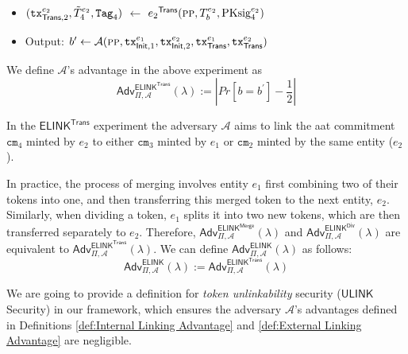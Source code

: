 \begin{definition}
\begin{itemize}
                \item[] $(\texttt{tx}_{\mathsf{Trans},2}^{e_2}, \Tilde{T}^{e_2}_4, \texttt{Tag}_4)$ $\leftarrow$ ${e_2}^\mathsf{Trans}(\textsc{pp}, T_b^{e_2}, \text{PKsig}^{e_2}_4)$
                
                \item[] Output: $b^\prime \leftarrow \mathcal{A}(\textsc{pp},\texttt{tx}_{\mathsf{Init}, 1}^{e_1}, \texttt{tx}_{\mathsf{Init}, 2}^{e_2}, \texttt{tx}_\mathsf{Trans}^{e_1}, \texttt{tx}_\mathsf{Trans}^{e_2})$
        \end{itemize}
We define $\mathcal{A}$'s advantage in the above experiment as
\begin{equation}
\label{eq:Adv_ELINK_Trans}
    \mathsf{Adv}^{\mathsf{ELINK}^\textsf{Trans}}_{\Pi, \mathcal{A}}(\lambda) := |Pr[b=b^\prime] - \frac{1}{2}|
\end{equation}


In the $\mathsf{ELINK}^\textsf{Trans}$ experiment the adversary $\mathcal{A}$ aims to link the \gls{aat} commitment $\texttt{cm}_4$ minted by $e_2$ to either $\texttt{cm}_3$ minted by $e_1$ or $\texttt{cm}_2$ minted by the same entity ($e_2$). 


In practice, the process of merging involves entity $e_1$ first combining two of their tokens into one, and then transferring this merged token to the next entity, $e_2$. Similarly, when dividing a token, $e_1$ splits it into two new tokens, which are then transferred separately to $e_2$. Therefore, $\mathsf{Adv}^{\mathsf{ELINK}^\textsf{Merge}}_{\Pi, \mathcal{A}}(\lambda)$ and $\mathsf{Adv}^{\mathsf{ELINK}^\textsf{Div}}_{\Pi, \mathcal{A}}(\lambda)$ are equivalent to $\mathsf{Adv}^{\mathsf{ELINK}^\textsf{Trans}}_{\Pi, \mathcal{A}}(\lambda)$. We can define $\mathsf{Adv}^{\mathsf{ELINK}}_{\Pi, \mathcal{A}}(\lambda)$ as follows:
\begin{equation}
\label{eq:Adv_ELINK}
    \mathsf{Adv}^{\mathsf{ELINK}}_{\Pi, \mathcal{A}}(\lambda) := 
    \mathsf{Adv}^{\mathsf{ELINK}^\textsf{Trans}}_{\Pi, \mathcal{A}}(\lambda) 
\end{equation}
            \end{definition}


We are going to provide a definition for \textit{token unlinkability} security ($\mathsf{ULINK}$ Security) in our framework, which ensures the adversary $\mathcal{A}$'s advantages defined in Definitions \ref{def:Internal Linking Advantage}  and \ref{def:External Linking Advantage} are negligible.



